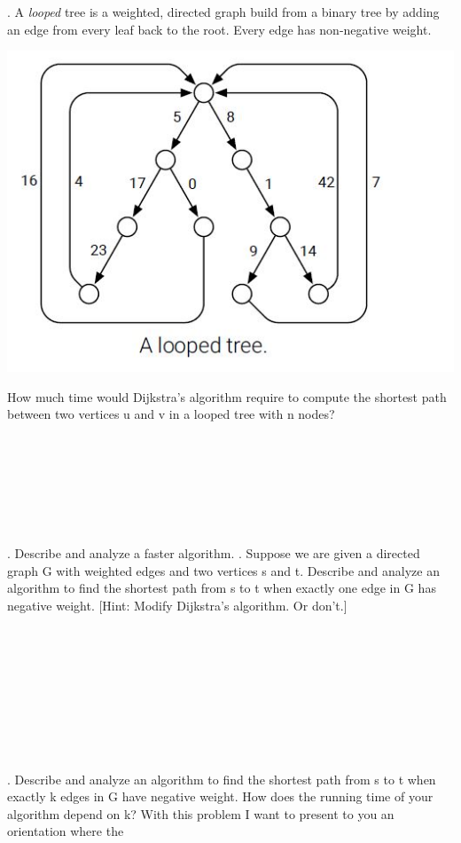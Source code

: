 \documentclass[12pt]{article}
\begin{document}
\newpage
{}. A \textit{looped} tree is a weighted, directed graph build from a binary tree by 
adding an edge from every leaf back to the root. Every edge has non-negative weight.\\
\centerline{\includegraphics{looped.jpg}}
How much time would Dijkstra’s algorithm require to compute the
shortest path between two vertices u and v in a looped tree with n
nodes?\\\\\\\\\\\\\\\\
. Describe and analyze a faster algorithm.
\newpage
{}. Suppose we are given a directed graph G with weighted edges and two
vertices s and t. Describe and analyze an algorithm to find the shortest path from s to
t when exactly one edge in G has negative weight. [Hint: Modify
Dijkstra’s algorithm. Or don’t.]\\\\\\\\\\\\\\\\\\\\
. Describe and analyze an algorithm to find the shortest path from s to t
when exactly k edges in G have negative weight. How does the running
time of your algorithm depend on k?
\newpage
\noindent With this problem I want to present to you an orientation where the 
\end{document}
